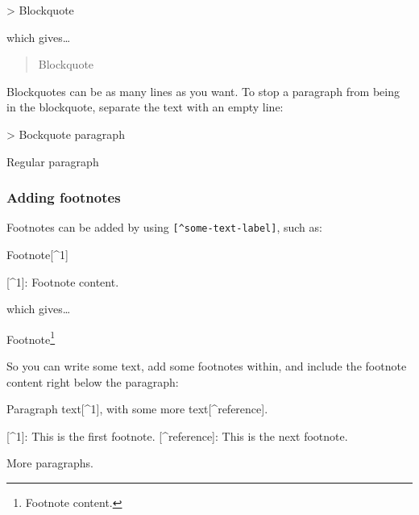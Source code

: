 \documentclass[]{Nemilov}
\newenvironment{Shaded}{\begin{snugshade}}{\end{snugshade}}
\newcommand{\DataTypeTok}[1]{\textcolor[rgb]{0.13,0.29,0.53}{#1}}
\newcommand{\NormalTok}[1]{#1}
\newcommand{\OtherTok}[1]{\textcolor[rgb]{0.56,0.35,0.01}{#1}}
\begin{document}
\begin{Shaded}
\begin{Highlighting}[]
\NormalTok{>}\DataTypeTok{ Blockquote}
\end{Highlighting}
\end{Shaded}

which gives\ldots{}

\begin{quote}
Blockquote
\end{quote}

Blockquotes can be as many lines as you want. To stop a paragraph from being in
the blockquote, separate the text with an empty line:

\begin{Shaded}
\begin{Highlighting}[]
\NormalTok{>}\DataTypeTok{ Bockquote paragraph}

\NormalTok{Regular paragraph}
\end{Highlighting}
\end{Shaded}

\hypertarget{adding-footnotes}{%
\subsubsection{Adding footnotes}\label{adding-footnotes}}

Footnotes can be added by using \texttt{{[}\^{}some-text-label{]}}, such as:

\begin{Shaded}
\begin{Highlighting}[]
\NormalTok{Footnote}\OtherTok{[^1]}

\OtherTok{[^1]}\NormalTok{: Footnote content.}
\end{Highlighting}
\end{Shaded}

which gives\ldots{}

Footnote\footnote{Footnote content.}

So you can write some text, add some footnotes within, and include the footnote
content right below the paragraph:

\begin{Shaded}
\begin{Highlighting}[]
\NormalTok{Paragraph text}\OtherTok{[^1]}\NormalTok{, with some more text}\OtherTok{[^reference]}\NormalTok{.}

\OtherTok{[^1]}\NormalTok{: This is the first footnote.}
\OtherTok{[^reference]}\NormalTok{: This is the next footnote.}

\NormalTok{More paragraphs.}
\end{Highlighting}
\end{Shaded}
\end{document}
